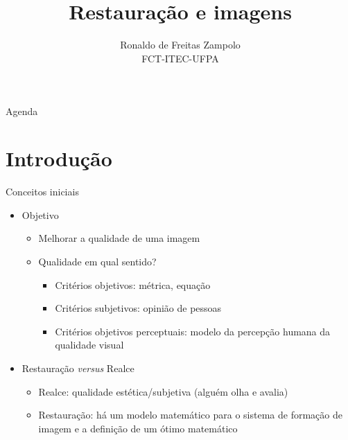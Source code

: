 

\DeclareMathOperator*{\mediana}{mediana}

\title{\cursogrande\\ \vspace{1cm}Restauração e imagens}
\author{Ronaldo de Freitas Zampolo\\FCT-ITEC-UFPA}


   \maketitle[randomdots={false}]
   \begin{slide}{Agenda}
      \tableofcontents[content=sections]
   \end{slide}

\section[ slide = true]{Introdução}
   \begin{slide}[toc=]{Conceitos iniciais}
      \begin{itemize}
       \item Objetivo
	       \begin{itemize}
		       \item Melhorar a qualidade de uma imagem
		       \item Qualidade em qual sentido? 
			       \begin{itemize}
				       \item Critérios objetivos: métrica, equação
				       \item Critérios subjetivos: opinião de pessoas
				       \item Critérios objetivos perceptuais: modelo da percepção humana da qualidade visual
			       \end{itemize}
	       \end{itemize}
       \item Restauração \emph{versus} Realce 
	       \begin{itemize}
		       \item Realce: qualidade estética/subjetiva (alguém olha e avalia)
		       \item Restauração: há um modelo matemático para o sistema de formação de imagem e a definição de um ótimo matemático
	       \end{itemize}
       \end{itemize}
   \end{slide}

